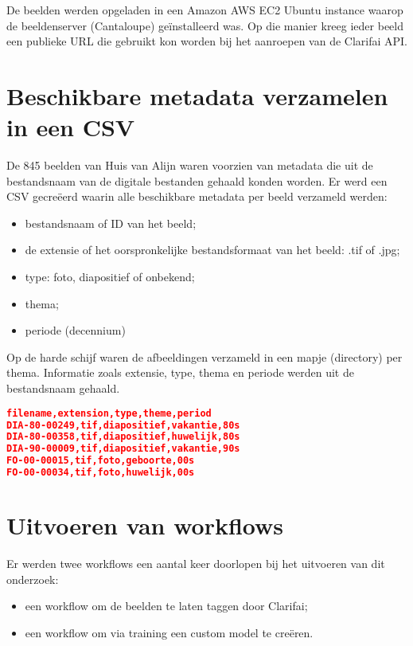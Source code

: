 De beelden werden opgeladen in een Amazon AWS EC2 Ubuntu instance waarop de beeldenserver (Cantaloupe) ge\"{i}nstalleerd was. Op die manier kreeg ieder beeld een publieke URL die gebruikt kon worden bij het aanroepen van de Clarifai API.

\section{Beschikbare metadata verzamelen in een CSV}
\label{sec:metadata-verzamelen-csv}

De 845 beelden van Huis van Alijn waren voorzien van metadata die uit de bestandsnaam van de digitale bestanden gehaald konden worden. Er werd een CSV gecreëerd waarin alle beschikbare metadata per beeld verzameld werden:
\begin{itemize}
	\item bestandsnaam of ID van het beeld;
	\item de extensie of het oorspronkelijke bestandsformaat van het beeld: .tif of .jpg;
	\item type: foto, diapositief of onbekend;
	\item thema;
	\item periode (decennium)
\end{itemize}

Op de harde schijf waren de afbeeldingen verzameld in een mapje (directory) per thema. Informatie zoals extensie, type, thema en periode werden uit de bestandsnaam gehaald.

\begin{lstlisting}[language=json,caption=een fragment van de CSV. De bestandsnaam heeft de logica \textit{type-periode-nr} waaruit het type van het originele beeld (foto of dia) en de periode gehaald kan worden.]
filename,extension,type,theme,period
DIA-80-00249,tif,diapositief,vakantie,80s
DIA-80-00358,tif,diapositief,huwelijk,80s
DIA-90-00009,tif,diapositief,vakantie,90s
FO-00-00015,tif,foto,geboorte,00s
FO-00-00034,tif,foto,huwelijk,00s
\end{lstlisting}

\section{Uitvoeren van workflows}
\label{sec:uitvoeren-workflows}

Er werden twee workflows een aantal keer doorlopen bij het uitvoeren van dit onderzoek:
\begin{itemize}
	\item een workflow om de beelden te laten taggen door Clarifai;
	\item een workflow om via training een custom model te cre\"{e}ren.
\end{itemize}

